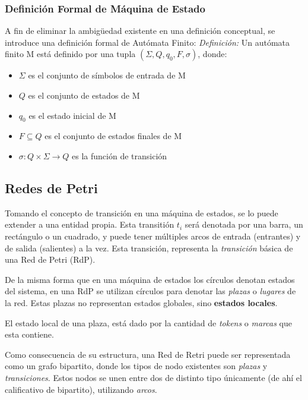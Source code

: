 \subsubsection{Definición Formal de Máquina de Estado}

A fin de eliminar la ambigüedad existente en una definición conceptual, se
introduce una definición formal de Autómata Finito:
\newline\newline\emph{Definición:} Un autómata finito M está definido por una
tupla $(\Sigma, Q, q_{0}, F, \sigma)$, donde:
\begin{itemize}    
  \item $\Sigma$ es el conjunto de símbolos de entrada de M
  \item $Q$ es el conjunto de estados de M
  \item $q_{0}$ es el estado inicial de M
  \item $F \subseteq Q$ es el conjunto de estados finales de M
  \item $\sigma : Q  \times \Sigma \rightarrow Q$ es la función de
  transición
\end{itemize} \cite{FSM_Wright}

\subsection{Redes de Petri}

Tomando el concepto de transición en una máquina de estados, se lo puede
extender a una entidad propia.
Esta transitión $t_{i}$ será denotada por una barra, un rectángulo o un
cuadrado, y puede tener múltiples arcos de entrada (entrantes) y de salida
(salientes) a la vez. Esta transición, representa la \textit{transición} básica
de una Red de Petri (RdP).\cite{PetriNetsFundamentals}

De la misma forma que en una máquina de estados los círculos denotan estados
del sistema, en una RdP se utilizan círculos para denotar las \textit{plazas} o
\textit{lugares} de la red. Estas plazas no representan estados globales, sino
\textbf{estados locales}. \cite{PetriNetsFundamentals}

El estado local de una plaza, está dado por la cantidad de \textit{tokens} o
\textit{marcas} que esta contiene.

Como consecuencia de su estructura, una Red de Retri puede ser representada como
un grafo bipartito, donde los tipos de nodo existentes son \textit{plazas} y
\textit{transiciones}. Estos nodos se unen entre dos de distinto tipo
únicamente (de ahí el calificativo de bipartito), utilizando \textit{arcos}.\\


